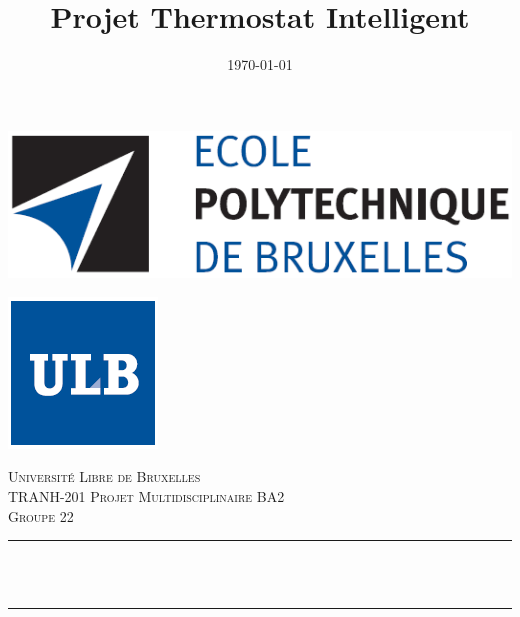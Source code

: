 \documentclass[12pt]{report}
\title{Projet Thermostat Intelligent}
\date{\today}
\makeatletter
\let\thetitle\@title
\makeatother
\begin{document}
\begin{titlepage}
    \centering
    
    \begin{minipage}{0.48\textwidth} \begin{flushleft}
	\includegraphics[scale = 0.6]{Logo.PNG}
	\end{flushleft}\end{minipage}
	\begin{minipage}{0.48\textwidth} \begin{flushright}
	\includegraphics[scale = 0.6]{ULB.PNG}
	\end{flushright}\end{minipage}
    
    \vspace{6 cm}
    
    \textsc{\LARGE Universit\'{e} Libre de Bruxelles}\\[2.0 cm]
    \textsc{\Large TRANH-201 Projet Multidisciplinaire BA2}\\[0.5 cm]               
    \textsc{\large Groupe 22}\\[0.5 cm]               
    \rule{\linewidth}{0.2 mm} \\[0.4 cm]
    { \huge \bfseries \thetitle}\\
    \rule{\linewidth}{0.2 mm} \\[1.5 cm]
    

\end{titlepage}
\end{document}
